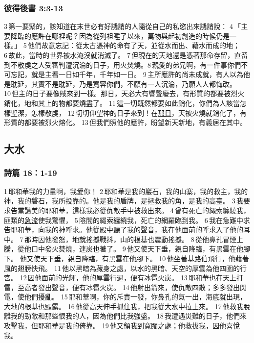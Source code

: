 \subsubsection{彼得後書 3:3-13}
 3 第一要緊的，該知道在末世必有好譏誚的人隨從自己的私慾出來譏誚說： 4 「主要降臨的應許在哪裡呢？因為從列祖睡了以來，萬物與起初創造的時候仍是一樣。」 5 他們故意忘記：從太古憑神的命有了天，並從水而出、藉水而成的地； 6 故此，當時的世界被水淹沒就消滅了。 7 但現在的天地還是憑著那命存留，直留到不敬虔之人受審判遭沉淪的日子，用火焚燒。8 親愛的弟兄啊，有一件事你們不可忘記，就是主看一日如千年，千年如一日。 9 主所應許的尚未成就，有人以為他是耽延，其實不是耽延，乃是寬容你們，不願有一人沉淪，乃願人人都悔改。 10 但主的日子要像賊來到一樣。那日，天必大有響聲廢去，有形質的都要被烈火銷化，地和其上的物都要燒盡了。 11 這一切既然都要如此銷化，你們為人該當怎樣聖潔，怎樣敬虔， 12 切切仰望神的日子來到！在\underline{那日}，天被火燒就銷化了，有形質的都要被烈火熔化。 13 但我們照他的應許，盼望新天新地，有義居在其中。

\subsection{大水}

\subsubsection{詩篇 18：1-19}
1 耶和華我的力量啊，我愛你！
2 耶和華是我的巖石，我的山寨，我的救主，我的神，我的磐石，我所投靠的。他是我的盾牌，是拯救我的角，是我的高臺。
3 我要求告當讚美的耶和華，這樣我必從仇敵手中被救出來。
4 曾有死亡的繩索纏繞我，匪類的\underline{急流}使我驚懼，
5 陰間的繩索纏繞我，死亡的網羅臨到我。
6 我在急難中求告耶和華，向我的神呼求。他從殿中聽了我的聲音，我在他面前的呼求入了他的耳中。
7 那時因他發怒，地就搖撼戰抖，山的根基也震動搖撼。
8 從他鼻孔冒煙上騰，從他口中發火焚燒，連炭也著了。
9 他又使天下垂，親自降臨，有黑雲在他腳下。
他又使天下垂，親自降臨，有黑雲在他腳下。
10 他坐著基路伯飛行，他藉著風的翅膀快飛。
11 他以黑暗為藏身之處，以水的黑暗、天空的厚雲為他四圍的行宮。
12 因他面前的光輝，他的厚雲行過，便有冰雹火炭。
13 耶和華也在天上打雷，至高者發出聲音，便有冰雹火炭。
14 他射出箭來，使仇敵四散；多多發出閃電，使他們擾亂。
15 耶和華啊，你的斥責一發，你鼻孔的氣一出，海底就出現，大地的根基也顯露。
16 他從高天伸手抓住我，把我從\underline{大水}中拉上來。
17 他救我脫離我的勁敵和那些恨我的人，因為他們比我強盛。
18 我遭遇災難的日子，他們來攻擊我，但耶和華是我的倚靠。
19 他又領我到寬闊之處；他救拔我，因他喜悅我。


